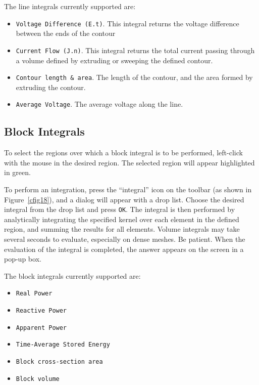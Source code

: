 The line integrals currently supported are:

\begin{itemize}
\item \texttt{Voltage Difference (E.t)}. This integral returns the 
voltage difference between the ends of the contour

\item \texttt{Current Flow (J.n)}. This integral returns the total current passing through
a volume defined by extruding or sweeping the defined contour.

\item \texttt{Contour length \& area}. The length of the contour, and the area formed by
extruding the contour.

\item \texttt{Average Voltage}. The average voltage along the line.
\end{itemize}



\subsection{Block Integrals}

To select the regions over which a block integral is to be performed,
left-click with the mouse in the desired region. The selected region will
appear highlighted in green.

To perform an integration, press the ``integral'' icon on the
toolbar (as shown in Figure~\ref{cfig18}), and a dialog will appear
with a drop list. Choose the desired integral from the drop list
and press \texttt{OK}. The integral is then performed by
analytically integrating the specified kernel over each element in
the defined region, and summing the results for all elements.
Volume integrals may take several seconds to evaluate, especially
on dense meshes. Be patient. When the evaluation of the integral is
completed, the answer appears on the screen in a pop-up box.

The block integrals currently supported are:
\begin{itemize}
\item \texttt{Real Power}
\item \texttt{Reactive Power}
\item \texttt{Apparent Power}
\item \texttt{Time-Average Stored Energy}
\item \texttt{Block cross-section area}
\item \texttt{Block volume}
\end{itemize}
